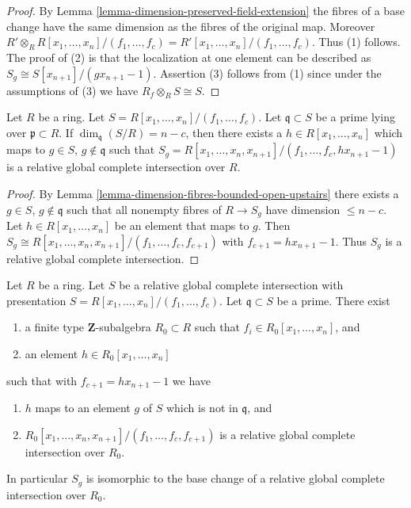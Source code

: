 \begin{proof}
By Lemma \ref{lemma-dimension-preserved-field-extension}
the fibres of a base change have the same dimension as the
fibres of the original map. Moreover
$R' \otimes_R R[x_1, \ldots, x_n]/(f_1, \ldots, f_c)
= R'[x_1, \ldots, x_n]/(f_1, \ldots, f_c)$. Thus (1) follows.
The proof of (2) is that
the localization at one element can be described as
$S_g \cong S[x_{n + 1}]/(gx_{n + 1} - 1)$.
Assertion (3) follows from (1) since under the assumptions of (3) we have
$R_f \otimes_R S \cong S$.
\end{proof}

\begin{lemma}
\label{lemma-localize-relative-complete-intersection}
Let $R$ be a ring.
Let $S = R[x_1, \ldots, x_n]/(f_1, \ldots, f_c)$.
Let $\mathfrak q \subset S$ be a prime lying over $\mathfrak p \subset R$.
If $\dim_{\mathfrak q}(S/R) = n - c$, then there
exists a $h \in R[x_1, \ldots, x_n]$ which maps to $g \in S$,
$g \not \in \mathfrak q$ such that
$S_g = R[x_1, \ldots, x_n, x_{n + 1}]/(f_1, \ldots, f_c, hx_{n + 1} - 1)$
is a relative global complete intersection over $R$.
\end{lemma}

\begin{proof}
By Lemma \ref{lemma-dimension-fibres-bounded-open-upstairs}
there exists a $g \in S$, $g \not \in \mathfrak q$
such that all nonempty fibres of $R \to S_g$
have dimension $\leq n - c$. Let $h \in R[x_1, \ldots, x_n]$
be an element that maps to $g$.
Then $S_g \cong R[x_1, \ldots, x_n, x_{n + 1}]/(f_1, \ldots, f_c, f_{c + 1})$
with $f_{c + 1} = h x_{n + 1} - 1$. Thus $S_g$ is a
relative global complete intersection.
\end{proof}

\begin{lemma}
\label{lemma-relative-global-complete-intersection-Noetherian}
Let $R$ be a ring. Let $S$ be a relative global complete intersection
with presentation $S = R[x_1, \ldots, x_n]/(f_1, \ldots, f_c)$.
Let $\mathfrak q \subset S$ be a prime. There exist
\begin{enumerate}
\item  a finite type $\mathbf{Z}$-subalgebra $R_0 \subset R$
such that $f_i \in R_0[x_1, \ldots, x_n]$, and
\item an element $h \in R_0[x_1, \ldots, x_n]$
\end{enumerate}
such that with $f_{c + 1} = h x_{n + 1} - 1$ we have
\begin{enumerate}
\item $h$ maps to an element $g$ of $S$ which is not in $\mathfrak q$, and
\item $R_0[x_1, \ldots, x_n, x_{n + 1}]/(f_1, \ldots, f_c, f_{c + 1})$
is a relative global complete intersection over $R_0$.
\end{enumerate}
In particular $S_g$ is isomorphic to the base change of a
relative global complete intersection over $R_0$.
\end{lemma}

